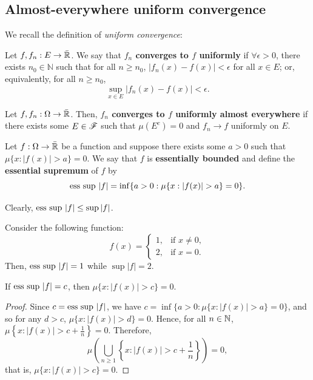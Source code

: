 \subsection{Almost-everywhere uniform convergence}

We recall the definition of \emph{uniform convergence}:

\begin{definition}
    Let $f, f_n: E \to \bar{\mathbb{R}}$. We say that \textbf{$f_n$ converges to $f$ uniformly} if $\forall \epsilon > 0$, there exists $n_0 \in \mathbb{N}$ such that for all $n \geq n_0$, $|f_n(x) - f(x)| < \epsilon$ for all $x \in E$; or, equivalently, for all $n \geq n_0$, 
    $$ \sup_{x \in E} |f_n(x) - f(x)| < \epsilon.$$
\end{definition}

\begin{definition}
    Let $f, f_n: \Omega \to \bar{\mathbb{R}}$. Then, \textbf{$f_n$ converges to $f$ uniformly almost everywhere} if there exists some $E \in \mathscr{F}$ such that $\mu(E^c) = 0$ and $f_n \to f$ uniformly on $E$.
\end{definition}

\begin{definition}
    Let $f: \Omega \to \bar{\mathbb{R}}$ be a function and suppose there exists some $a > 0$ such that $\mu \{ x: |f(x)| > a \} = 0$. We say that $f$ is \textbf{essentially bounded} and define the \textbf{essential supremum} of $f$ by
    $$ \textup{ess sup } |f| = \inf \{ a > 0 : \mu \{ x:|f(x)| > a \} = 0\}. $$ 
\end{definition}

Clearly, $\text{ess sup } |f| \leq \sup |f|$.

\begin{example}
    Consider the following function:
    $$ f(x) = 
    \begin{cases}
    1, & \text{if } x \neq 0, \\
    2, & \text{if } x = 0.    
    \end{cases} $$
    Then, $\text{ess sup } |f| = 1$ while $\sup |f| = 2$.
\end{example}

\begin{proposition}
    If $\text{ess sup } |f| = c$, then $\mu \{ x : |f(x)| > c \} = 0$.
\end{proposition}

\begin{proof}
    Since $c = \text{ess sup } |f|$, we have $c = \inf \{ a > 0 : \mu \{ x:|f(x)| > a \} = 0\}$, and so for any $d > c$, $\mu \{ x:|f(x)| > d \} = 0$. Hence, for all $n \in \mathbb{N}$, $\mu \left\{ x:|f(x)| > c + \frac{1}{n} \right\} = 0$. Therefore, 
    $$\mu \left( \bigcup_{n \geq 1}\left\{ x:|f(x)| > c + \frac{1}{n} \right\}\right) = 0,$$ 
    that is, $\mu \{ x : |f(x)| > c \} = 0$.
\end{proof}

